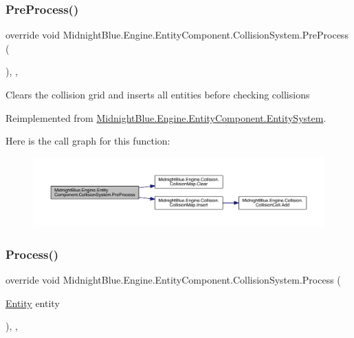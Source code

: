 \subsubsection{\texorpdfstring{Pre\+Process()}{PreProcess()}}
{\footnotesize\ttfamily override void Midnight\+Blue.\+Engine.\+Entity\+Component.\+Collision\+System.\+Pre\+Process (\begin{DoxyParamCaption}{ }\end{DoxyParamCaption})\hspace{0.3cm}{\ttfamily [inline]}, {\ttfamily [protected]}, {\ttfamily [virtual]}}



Clears the collision grid and inserts all entities before checking collisions 



Reimplemented from \hyperlink{class_midnight_blue_1_1_engine_1_1_entity_component_1_1_entity_system_a779da2924653b4402ca386dbc52bd3b1}{Midnight\+Blue.\+Engine.\+Entity\+Component.\+Entity\+System}.

Here is the call graph for this function\+:
\nopagebreak
\begin{figure}[H]
\begin{center}
\leavevmode
\includegraphics[width=350pt]{class_midnight_blue_1_1_engine_1_1_entity_component_1_1_collision_system_ab85ff8fd81369e705c461f58014f5ec2_cgraph}
\end{center}
\end{figure}
\hypertarget{class_midnight_blue_1_1_engine_1_1_entity_component_1_1_collision_system_a0fe9a2023d5fabc7861b50abfc607def}{}\label{class_midnight_blue_1_1_engine_1_1_entity_component_1_1_collision_system_a0fe9a2023d5fabc7861b50abfc607def} 
\subsubsection{\texorpdfstring{Process()}{Process()}}
{\footnotesize\ttfamily override void Midnight\+Blue.\+Engine.\+Entity\+Component.\+Collision\+System.\+Process (\begin{DoxyParamCaption}\item[{\hyperlink{class_midnight_blue_1_1_engine_1_1_entity_component_1_1_entity}{Entity}}]{entity }\end{DoxyParamCaption})\hspace{0.3cm}{\ttfamily [inline]}, {\ttfamily [protected]}, {\ttfamily [virtual]}}



